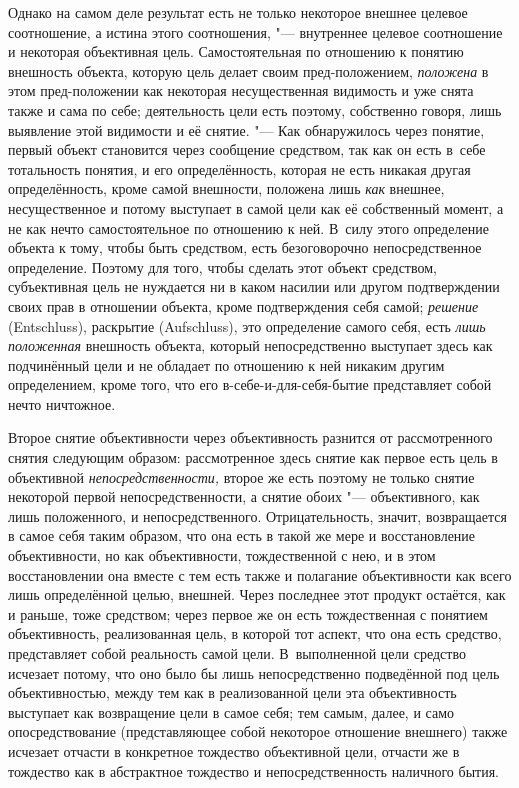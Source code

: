 Однако на самом деле результат есть не только некоторое
внешнее целевое соотношение, а истина этого соотношения, "---
внутреннее целевое соотношение и некоторая объективная цель.
Самостоятельная по отношению к понятию внешность объекта, которую цель
делает своим пред-положением,
{\em положена} в этом
пред-положении как некоторая несущественная видимость и уже
снята также и сама по себе; деятельность цели есть поэтому, собственно
говоря, лишь выявление этой видимости и её снятие. "--- Как
обнаружилось через понятие, первый объект становится через сообщение
средством, так как он есть в~себе тотальность понятия, и его
определённость, которая не есть никакая другая определённость, кроме самой
внешности, положена лишь {\em как}
внешнее, несущественное и потому выступает в самой цели как
её собственный момент, а не как нечто самостоятельное по отношению к ней.
В~силу этого определение объекта к тому, чтобы быть средством, есть
безоговорочно непосредственное определение. Поэтому для того, чтобы сделать
этот объект средством, субъективная цель не нуждается ни в каком насилии
или другом подтверждении своих прав в отношении объекта, кроме
подтверждения себя самой; {\em решение}
(Entschluss), раскрытие (Aufschluss), это
определение самого себя, есть {\em лишь
положенная} внешность объекта, который непосредственно
выступает здесь как подчинённый цели и не обладает по отношению к ней
никаким другим определением, кроме того, что его
в-себе-и-для-себя-бытие представляет собой нечто ничтожное.

Второе снятие объективности через объективность разнится от
рассмотренного снятия следующим образом: рассмотренное здесь снятие как
первое есть цель в объективной
{\em непосредственности,}
второе же есть поэтому не только снятие некоторой первой
непосредственности, а снятие обоих "--- объективного, как лишь
положенного, и непосредственного. Отрицательность, значит, возвращается в
самое себя таким образом, что она есть в такой же мере и восстановление
объективности, но как объективности, тождественной с нею, и в этом
восстановлении она вместе с тем есть также и полагание объективности как
всего лишь определённой целью, внешней. Через последнее этот продукт
остаётся, как и раньше, тоже средством; через первое же он есть
тождественная с понятием объективность, реализованная цель, в которой тот
аспект, что она есть средство, представляет собой реальность самой цели.
В~выполненной цели средство исчезает потому, что оно было бы лишь
непосредственно подведённой под цель объективностью, между тем как в
реализованной цели эта объективность выступает как возвращение цели в самое
себя; тем самым, далее, и само опосредствование (представляющее собой
некоторое отношение внешнего) также исчезает отчасти в конкретное тождество
объективной цели, отчасти же в тождество как в абстрактное тождество и
непосредственность наличного бытия.

